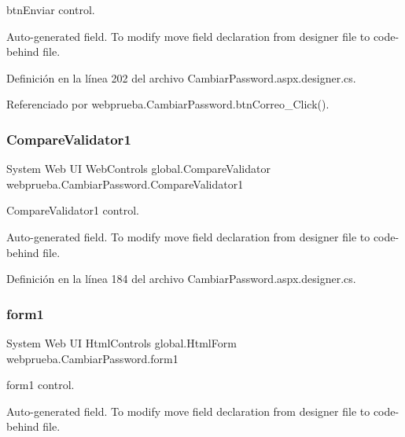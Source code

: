 btn\+Enviar control. 

Auto-\/generated field. To modify move field declaration from designer file to code-\/behind file. 

Definición en la línea 202 del archivo Cambiar\+Password.\+aspx.\+designer.\+cs.



Referenciado por webprueba.\+Cambiar\+Password.\+btn\+Correo\+\_\+\+Click().

\mbox{\label{classwebprueba_1_1_cambiar_password_a422d280bae9c9f3858b263638410b86a}} 
\subsubsection{\texorpdfstring{CompareValidator1}{CompareValidator1}}
{\footnotesize\ttfamily System Web UI Web\+Controls global.\+Compare\+Validator webprueba.\+Cambiar\+Password.\+Compare\+Validator1\hspace{0.3cm}{\ttfamily [protected]}}



Compare\+Validator1 control. 

Auto-\/generated field. To modify move field declaration from designer file to code-\/behind file. 

Definición en la línea 184 del archivo Cambiar\+Password.\+aspx.\+designer.\+cs.

\mbox{\label{classwebprueba_1_1_cambiar_password_aebe6cc7efa0dd3740d4071ba426d936b}} 
\subsubsection{\texorpdfstring{form1}{form1}}
{\footnotesize\ttfamily System Web UI Html\+Controls global.\+Html\+Form webprueba.\+Cambiar\+Password.\+form1\hspace{0.3cm}{\ttfamily [protected]}}



form1 control. 

Auto-\/generated field. To modify move field declaration from designer file to code-\/behind file. 

